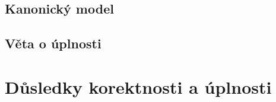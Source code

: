 





\subsection{Kanonický model}


\subsection{Věta o úplnosti}


\section{Důsledky korektnosti a úplnosti}


